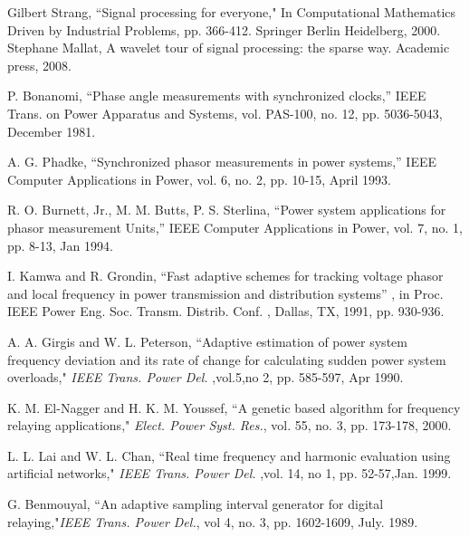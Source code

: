\documentclass{UCF_ETD}
\begin{document}
\begin{thebibliography}{99}

Gilbert Strang, ``Signal processing for everyone," In Computational Mathematics Driven by Industrial Problems, pp. 366-412. Springer Berlin Heidelberg, 2000.
Stephane Mallat, A wavelet tour of signal processing: the sparse way. Academic press, 2008.

P. Bonanomi, “Phase angle measurements with synchronized clocks,” IEEE Trans. on Power Apparatus and Systems, vol. PAS-100, no. 12, pp. 5036-5043, December 1981.

A. G. Phadke, “Synchronized phasor measurements in power systems,” IEEE Computer Applications in Power, vol. 6, no. 2, pp. 10-15, April 1993.

R. O. Burnett, Jr., M. M. Butts, P. S. Sterlina, “Power system applications for phasor measurement Units,” IEEE Computer Applications in Power, vol. 7, no. 1, pp. 8-13, Jan 1994.





I. Kamwa and R. Grondin, “Fast adaptive schemes for tracking voltage
phasor and local frequency in power transmission and distribution systems” , in Proc. IEEE Power Eng. Soc. Transm. Distrib. Conf. , Dallas, TX, 1991, pp. 930-936.

A. A. Girgis and W. L. Peterson, ``Adaptive estimation of power system frequency deviation and its rate of change for calculating sudden power system overloads," \emph{IEEE Trans. Power Del.} ,vol.5,no 2, pp. 585-597, Apr 1990.

K. M. El-Nagger and H. K. M. Youssef, ``A genetic based algorithm for frequency relaying applications," \emph{ Elect. Power Syst. Res.},  vol. 55, no. 3, pp. 173-178, 2000.

L. L. Lai and W. L. Chan, ``Real time frequency and harmonic evaluation using artificial networks," \emph{IEEE Trans. Power Del.} ,vol. 14, no 1, pp. 52-57,Jan.  1999.

G. Benmouyal, ``An adaptive sampling interval generator for digital relaying,"\emph{IEEE Trans. Power  Del.}, vol 4, no. 3, pp. 1602-1609, July. 1989.


\end{thebibliography}
\end{document}
